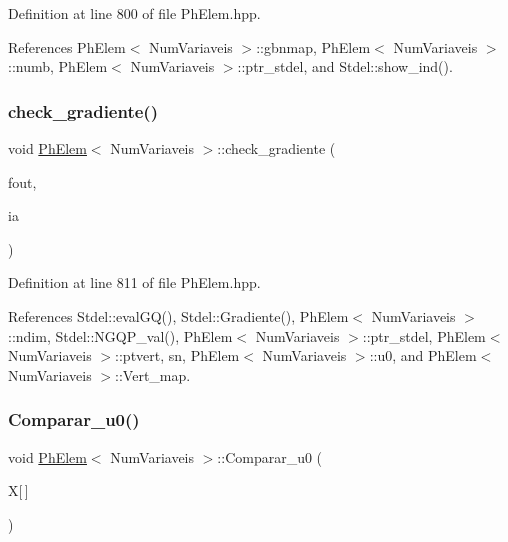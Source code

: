 Definition at line 800 of file Ph\+Elem.\+hpp.



References Ph\+Elem$<$ Num\+Variaveis $>$\+::gbnmap, Ph\+Elem$<$ Num\+Variaveis $>$\+::numb, Ph\+Elem$<$ Num\+Variaveis $>$\+::ptr\+\_\+stdel, and Stdel\+::show\+\_\+ind().

\mbox{\label{classPhElem_a298b653fae7c86dea6ad0eea09b7e621}} 
\subsubsection{\texorpdfstring{check\+\_\+gradiente()}{check\_gradiente()}}
{\footnotesize\ttfamily void \hyperlink{classPhElem}{Ph\+Elem}$<$ Num\+Variaveis $>$\+::check\+\_\+gradiente (\begin{DoxyParamCaption}\item[{F\+I\+LE $\ast$}]{fout,  }\item[{const int \&}]{ia }\end{DoxyParamCaption})\hspace{0.3cm}{\ttfamily [inherited]}}



Definition at line 811 of file Ph\+Elem.\+hpp.



References Stdel\+::eval\+G\+Q(), Stdel\+::\+Gradiente(), Ph\+Elem$<$ Num\+Variaveis $>$\+::ndim, Stdel\+::\+N\+G\+Q\+P\+\_\+val(), Ph\+Elem$<$ Num\+Variaveis $>$\+::ptr\+\_\+stdel, Ph\+Elem$<$ Num\+Variaveis $>$\+::ptvert, sn, Ph\+Elem$<$ Num\+Variaveis $>$\+::u0, and Ph\+Elem$<$ Num\+Variaveis $>$\+::\+Vert\+\_\+map.

\mbox{\label{classPhElem_a9ea744b94e057733c1d396d9f46ddcce}} 
\subsubsection{\texorpdfstring{Comparar\+\_\+u0()}{Comparar\_u0()}}
{\footnotesize\ttfamily void \hyperlink{classPhElem}{Ph\+Elem}$<$ Num\+Variaveis $>$\+::Comparar\+\_\+u0 (\begin{DoxyParamCaption}\item[{const double}]{X\mbox{[}$\,$\mbox{]} }\end{DoxyParamCaption})\hspace{0.3cm}{\ttfamily [inherited]}}



